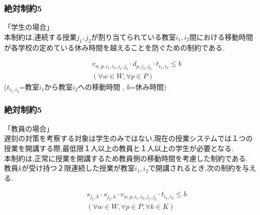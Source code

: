 \documentclass[dvipdfmx,12pt]{beamer}
\begin{document}
\begin{frame}

  \frametitle{\LARGE 絶対制約5}



\vspace{5.0mm}

{\Large 「学生の場合」}\\
本制約は,連続する授業$j_1,j_2$が割り当てられている教室$i_1,i_2$間における移動時間が各学校の定めている休み時間を越えることを防ぐための制約である.

{\Large
\begin{eqnarray}
&&v_{w,p,i_1,i_2,j_1,j_2}\cdot d_{p,j_1,j_2}\cdot t_{i_1,i_2} \leq b 
\label{eqn:seiyaku_first} \\ 
&& \left(\forall w \in W,\forall p \in P\right)\nonumber 
\end{eqnarray}
}
{\large
($t_{i_1,i_2}$=教室$i_1$から教室$i_2$への移動時間 , $b$=休み時間)
}
\end{frame}




\begin{frame}

  \frametitle{\LARGE 絶対制約5}



\vspace{2.0mm}

{\Large 「教員の場合」}\\

遅刻の対策を考察する対象は学生のみではない,現在の授業システムでは１つの授業を開講する際,最低限１人以上の教員と１人以上の学生が必要となる.\\
本制約は,正常に授業を開講するため教員側の移動時間を考慮した制約である.\\
教員$k$が受け持つ２限連続した授業が教室$i_1,i_2$で開講されるとき,次の制約を与える.


\begin{eqnarray}
&&s_{j_1,k}\cdot s_{j_2,k}\cdot v_{w,p,i_1,i_2,j_1,j_2}\cdot t_{i_1,i_2}\leq b\\
\label{eqn:seiyaku_first} 
&& \left(\forall w \in W,\forall p \in P,\forall k \in K\right)\nonumber 
\end{eqnarray}

\end{frame}
\fi
\end{document}
